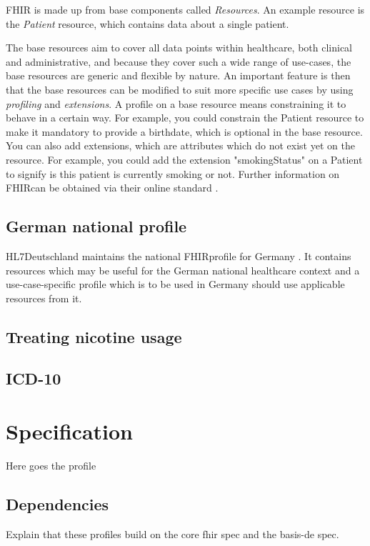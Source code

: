 \documentclass[12px]{report}
\newcommand{\fhir}{FHIR\textsuperscript{\textregistered}}
\newcommand{\hl}{HL7\textsuperscript{\textregistered}}
\begin{document}
FHIR is made up from base components called \textit{Resources}. An example resource is the \textit{Patient} resource, which contains data about a single patient. 

The base resources aim to cover all data points within healthcare, both clinical and administrative, and because they cover such a wide range of use-cases, the base resources are generic and flexible by nature.
An important feature is then that the base resources can be modified to suit more specific use cases by using \textit{profiling} and \textit{extensions}. A profile on a base resource means constraining it to behave in a certain way.
For example, you could constrain the Patient resource to make it mandatory to provide a birthdate, which is optional in the base resource. You can also add extensions, which are attributes which do not exist yet on the resource. For example, you could
add the extension "smokingStatus" on a Patient to signify is this patient is currently smoking or not. Further information on \fhir can be obtained via their online standard \cite{FHIR}.

\section{German national profile}
\hl Deutschland \cite{hlde} maintains the national \fhir profile for Germany \cite{debasis}. It contains resources which may be useful for the German national healthcare context and a use-case-specific profile which is to be used in Germany should use applicable resources from it.

\section{Treating nicotine usage}
\section{ICD-10} %

\chapter{Specification}
\label{ch:spec}

Here goes the profile

\section{Dependencies}
Explain that these profiles build on the core fhir spec and the basis-de spec.
\end{document}
